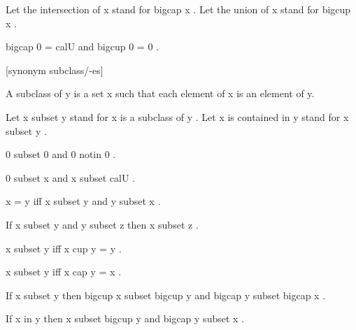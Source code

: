 \documentclass[a4paper,draft]{amsproc}
\begin{document}
\begin{forthel}
Let the intersection of  x  stand for  bigcap x .
Let the union of  x  stand for  bigcup x .

\begin{theorem}
 bigcap 0 = cal{U}  and  bigcup 0 = 0 .
\end{theorem}




[synonym subclass/-es]
\begin{definition}  
A subclass of y is a set x such that each element of x is an
element of y. 
\end{definition}

Let  x subset y  stand for  x  is a subclass of  y .
Let  x  is contained in  y  stand for  x subset y .

\begin{lemma}
 0 subset 0  and  0 notin 0 .
\end{lemma}

\begin{theorem}
 0 subset x  and  x subset cal{U} .
\end{theorem}

\begin{theorem}
 x = y  iff  x subset y  and  y subset x .
\end{theorem}

\begin{theorem}
If  x subset y  and  y subset z  then  x subset z .
\end{theorem}

\begin{theorem}
 x subset y  iff  x cup y = y .
\end{theorem}

\begin{theorem}
 x subset y  iff  x cap y = x .
\end{theorem}

\begin{theorem}
If  x subset y  then  bigcup x subset bigcup y 
and  bigcap y subset bigcap x .
\end{theorem}

\begin{theorem}
If  x in y  then  x subset bigcup y  
and  bigcap y subset x .
\end{theorem}
\end{forthel}
\end{document}
